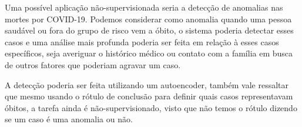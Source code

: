 \documentclass[12pt]{article}
\begin{document}
Uma possível aplicação não-supervisionada seria a detecção de anomalias nas mortes por COVID-19. Podemos considerar como anomalia quando uma pessoa saudável ou fora do grupo de risco vem a óbito, o sistema poderia detectar esses casos e uma análise mais profunda poderia ser feita em relação à esses casos específicos, seja averiguar o histórico médico ou contato com a família em busca de outros fatores que poderiam agravar um caso. 

A detecção poderia ser feita utilizando um autoencoder, também vale ressaltar que mesmo usando o rótulo de conclusão para definir quais casos representavam óbitos, a tarefa ainda é não-supervisionado, visto que não temos o rótulo dizendo se um caso é uma anomalia ou não.





\end{document}
